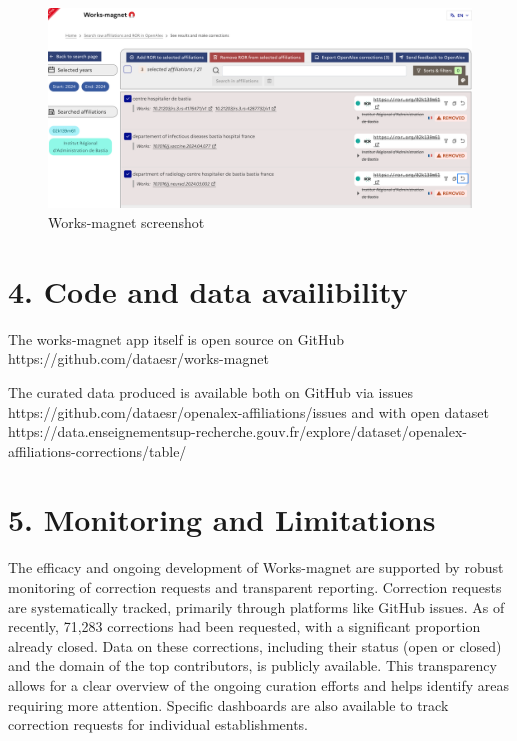 \documentclass[
]{article}
\begin{document}
\begin{figure}
\centering
\includegraphics[width=6.25in,height=\textheight]{./wm1.png}
\caption{Works-magnet screenshot}
\end{figure}

\hypertarget{code-and-data-availibility}{%
\section{4. Code and data
availibility}\label{code-and-data-availibility}}

The works-magnet app itself is open source on GitHub
https://github.com/dataesr/works-magnet

The curated data produced is available both on GitHub via issues
https://github.com/dataesr/openalex-affiliations/issues and with open
dataset
https://data.enseignementsup-recherche.gouv.fr/explore/dataset/openalex-affiliations-corrections/table/

\hypertarget{monitoring-and-limitations}{%
\section{5. Monitoring and
Limitations}\label{monitoring-and-limitations}}

The efficacy and ongoing development of Works-magnet are supported by
robust monitoring of correction requests and transparent reporting.
Correction requests are systematically tracked, primarily through
platforms like GitHub issues. As of recently, 71,283 corrections had
been requested, with a significant proportion already closed. Data on
these corrections, including their status (open or closed) and the
domain of the top contributors, is publicly available. This transparency
allows for a clear overview of the ongoing curation efforts and helps
identify areas requiring more attention. Specific dashboards are also
available to track correction requests for individual establishments.
\end{document}
